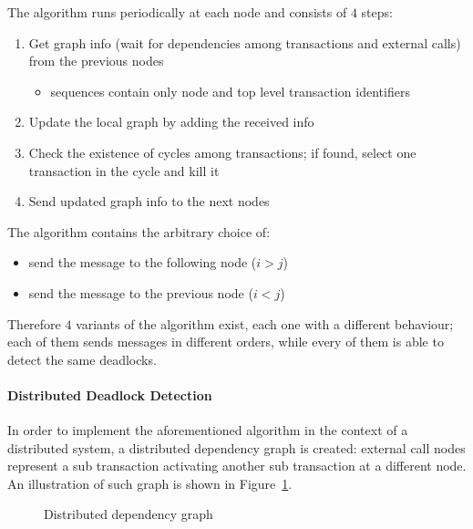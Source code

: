 \documentclass[english]{article}
\begin{document}
\bigskip
The algorithm runs periodically at each node and consists of \(4\) steps:

\begin{enumerate}
  \item Get graph info (wait for dependencies among transactions and external calls) from the previous nodes
        \begin{itemize}[label=\(\rightarrow\)]
          \item sequences contain only node and top level transaction identifiers
        \end{itemize}
  \item Update the local graph by adding the received info
  \item Check the existence of cycles among transactions; if found, select one transaction in the cycle and kill it
  \item Send updated graph info to the next nodes
\end{enumerate}

\bigskip
The algorithm contains the arbitrary choice of:
\begin{itemize}
  \item send the message to the following node (\(i > j\))
  \item send the message to the previous node (\(i < j\))
\end{itemize}
Therefore \(4\) variants of the algorithm exist, each one with a different behaviour;
each of them sends messages in different orders, while every of them is able to detect the same deadlocks.

\paragraph{Distributed Deadlock Detection}

In order to implement the aforementioned algorithm in the context of a distributed system, a distributed dependency graph is created:
external call nodes represent a sub transaction activating another sub transaction at a different node.
An illustration of such graph is shown in Figure~\ref{fig:distributed-dep-graph}.

\begin{figure}[htbp]
  \centering
  \bigskip
  \caption{Distributed dependency graph}
  \label{fig:distributed-dep-graph}
  \bigskip
\end{figure}
\end{document}
